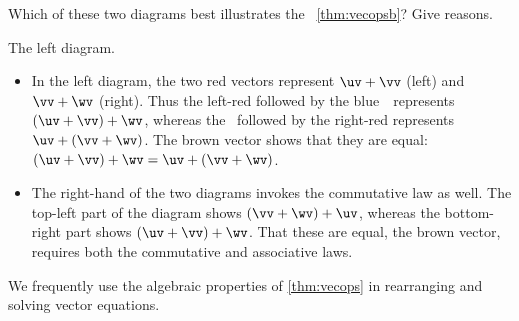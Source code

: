 \begin{example} 
Which of these two diagrams best illustrates the ~\ref{thm:vecopsb}?  Give reasons.
\begin{solution} 
The left diagram.

\begin{itemize}
\item In the left diagram, the two red vectors represent \(\uv+\vv\) (left) and \(\vv+\wv\) (right).
Thus the left-red followed by the blue~\wv\ represents \((\uv+\vv)+\wv\), whereas the \uv\ followed by the right-red represents \(\uv+(\vv+\wv)\).
The brown vector shows that they are equal: \((\uv+\vv)+\wv=\uv+(\vv+\wv)\).
\fixwrapitem
\item The right-hand of the two diagrams invokes the commutative law as well.
The top-left part of the diagram shows \((\vv+\wv)+\uv\), whereas the bottom-right part shows \((\uv+\vv)+\wv\).
That these are equal, the brown vector, requires both the commutative and associative laws.
\aqed
\end{itemize}
\end{solution}
\end{example}


We frequently use the algebraic properties of \cref{thm:vecops} in rearranging and solving vector equations. 

